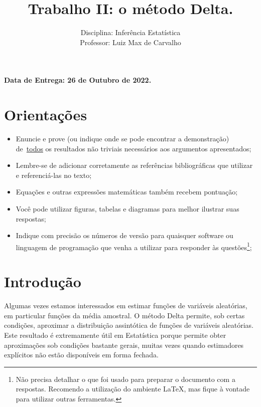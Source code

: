 \documentclass[a4paper,10pt, notitlepage]{report}
\title{Trabalho II: o método Delta.}
\author{Disciplina: Inferência Estatística \\ Professor: Luiz Max de Carvalho}
\begin{document}
\maketitle

\textbf{Data de Entrega: 26 de Outubro de 2022.}

\section*{Orientações}
\begin{itemize}
 \item Enuncie e prove (ou indique onde se pode encontrar a demonstração) de~\underline{todos} os resultados não triviais necessários aos argumentos apresentados;
 \item Lembre-se de adicionar corretamente as referências bibliográficas que utilizar e referenciá-las no texto;
 \item Equações e outras expressões matemáticas também recebem pontuação;
 \item Você pode utilizar figuras, tabelas e diagramas para melhor ilustrar suas respostas;
 \item Indique com precisão os números de versão para quaisquer software ou linguagem de programação que venha a utilizar para responder às questões\footnote{Não precisa detalhar o que foi usado para preparar o documento com a respostas. Recomendo a utilização do ambiente LaTeX, mas fique à vontade para utilizar outras ferramentas.};
 \end{itemize}


\section*{Introdução}

Algumas vezes estamos interessados em estimar funções de variáveis aleatórias, em particular funções da média amostral.
O método Delta permite, sob certas condições, aproximar a distribuição assintótica de funções de variáveis aleatórias.
Este resultado é extremamente útil em Estatística porque permite obter aproximações sob condições bastante gerais, muitas vezes quando estimadores explícitos não estão disponíveis em forma fechada.
\end{document}
